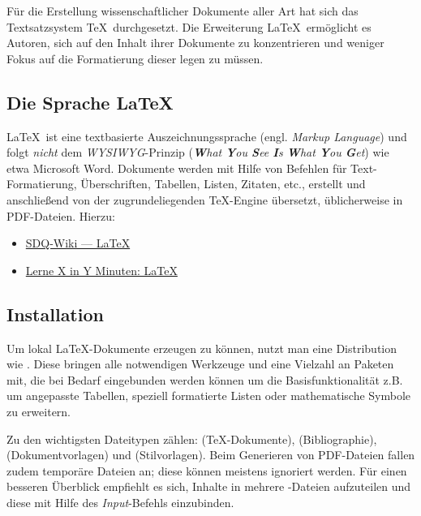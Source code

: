 Für die Erstellung wissenschaftlicher Dokumente aller Art hat sich das Textsatzsystem \TeX\ durchgesetzt. 
Die Erweiterung \LaTeX\ ermöglicht es Autoren, sich auf den Inhalt ihrer Dokumente zu konzentrieren und weniger Fokus auf die Formatierung dieser legen zu müssen.

\subsection{Die Sprache \LaTeX}
\label{sec:Schreiben:Sprache}

\LaTeX\ ist eine textbasierte Auszeichnungssprache (engl. \emph{Markup Language}) und folgt \emph{nicht} dem \emph{WYSIWYG}-Prinzip (\emph{\textbf{W}hat \textbf{Y}ou \textbf{S}ee \textbf{I}s \textbf{W}hat \textbf{Y}ou \textbf{G}et}) wie etwa Microsoft Word. 
Dokumente werden mit Hilfe von Befehlen für Text-Formatierung, Überschriften, Tabellen, Listen, Zitaten, etc., erstellt und anschließend von der zugrundeliegenden \TeX-Engine übersetzt, üblicherweise in PDF-Dateien.
Hierzu: 

\smallskip
\begin{itemize}[label={\symbolInfo}]
    \item \href{https://sdqweb.ipd.kit.edu/wiki/LaTeX}{SDQ-Wiki --- LaTeX}
    \item \href{https://learnxinyminutes.com/docs/de-de/latex-de/}{Lerne X in Y Minuten: LaTeX}
\end{itemize}

\subsection{Installation}
\label{sec:Schreiben:Installation}

Um lokal \LaTeX-Dokumente erzeugen zu können, nutzt man eine Distribution wie . 
Diese bringen alle notwendigen Werkzeuge und eine Vielzahl an Paketen mit, die bei Bedarf eingebunden werden können um die Basisfunktionalität z.B. um angepasste Tabellen, speziell formatierte Listen oder mathematische Symbole zu erweitern.

Zu den wichtigsten Dateitypen zählen:  (\TeX-Dokumente),  (Bibliographie),  (Dokumentvorlagen) und  (Stilvorlagen).
Beim Generieren von PDF-Dateien fallen zudem temporäre Dateien an; diese können meistens ignoriert werden.
Für einen besseren Überblick empfiehlt es sich, Inhalte in mehrere -Dateien aufzuteilen und diese mit Hilfe des \emph{Input}-Befehls einzubinden.

